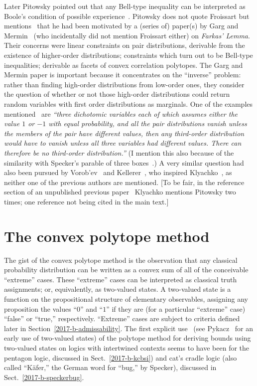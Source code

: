 \documentclass[%
  twocolumn,
 showpacs,
 showkeys,
 preprintnumbers,
 amsmath,amssymb,
 aps,
  pra,
  longbibliography,
 floatfix,
 ]{revtex4-1}
\begin{document}
Later Pitowsky pointed out that any Bell-type inequality can be interpreted as
Boole's condition of possible experience~\cite{pitowsky-86,pitowsky,pitowsky-89a,Pit-91,Pit-94,2000-poly}.
Pitowsky  does not quote Froissart but mentions~\cite[p.~1556]{pitowsky-86} that he
had been motivated by a (series of) paper(s) by Garg and Mermin~\cite{Garg1984}
(who incidentally did not mention Froissart either)
on  {\em Farkas' Lemma}.
Their concerns were linear constraints on pair distributions, derivable from the existence of higher-order distributions;
constraints which turn out to be Bell-type inequalities; derivable as facets of convex correlation polytopes.
The Garg and Mermin paper is important because it concentrates on the ``inverse'' problem:
rather than finding high-order distributions
from low-order ones,  they consider the
question of whether or not those high-order distributions could return random variables with first order distributions as
marginals. One of the examples mentioned~\cite[p.~2]{Garg1984}
are {\em ``three dichotomic
variables each of which assumes either the value $1$ or $-1$ with equal
probability, and all the pair distributions vanish unless the members of the
pair have different values, then any third-order distribution would have to
vanish unless all three variables had different values. There can therefore be
no third-order distribution.''}
(I mention this also because of the similarity with Specker's parable of three boxes~\cite{specker-60,svozil-2016-s}.)
A very similar question had also been pursued by Vorob'ev~\cite{Vorobev-1962} and Kellerer~\cite{Kellerer-1964,Kellerer-1984},
who inspired Klyachko~\cite{Klyachko-2008},
as neither one of the previous authors are mentioned.
[To be fair, in the reference section of an unpublished previous paper~\cite{Klyachko-2002} Klyachko
mentions Pitowsky two times; one reference not being cited in the main text.]


\section{The convex polytope method}
\label{2017-b-chm}

The gist of the convex polytope method is the observation that
any classical probability distribution can be written as a convex sum of all of the conceivable ``extreme'' cases.
These ``extreme'' cases can be interpreted as classical truth assignments; or, equivalently,
as two-valued states. A two-valued state is a function on the propositional structure of elementary observables,
assigning any proposition the values ``$0$'' and ``$1$'' if they are (for a particular ``extreme'' case)
``false'' or ``true,'' respectively.
``Extreme'' cases are subject to  criteria defined later in Section~\ref{2017-b-admissability}.
The first explicit use~\cite{svozil-2001-cesena,svozil-2001-eua,svozil-2008-ql,svozil-2016-s}
(see Pykacz~\cite{Pykacz1989} for an early use of two-valued states)
of the polytope method for deriving bounds using two-valued states on logics with intertwined contexts
seems to have been for the pentagon logic, discussed in Sect.~\ref{2017-b-kcbsi}) and cat's cradle logic
(also called ``K\"afer,'' the German word for ``bug,'' by Specker), discussed in Sect.~\ref{2017-b-speckerbug}.
\end{document}
